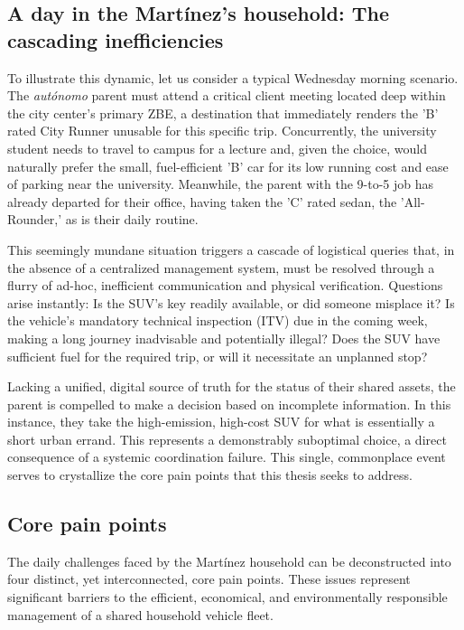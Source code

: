 \subsection{A day in the Martínez's household: The cascading inefficiencies}

To illustrate this dynamic, let us consider a typical Wednesday morning scenario. The \textit{autónomo} parent must attend a critical client meeting located deep within the city center's primary ZBE, a destination that immediately renders the 'B' rated City Runner unusable for this specific trip. Concurrently, the university student needs to travel to campus for a lecture and, given the choice, would naturally prefer the small, fuel-efficient 'B' car for its low running cost and ease of parking near the university. Meanwhile, the parent with the 9-to-5 job has already departed for their office, having taken the 'C' rated sedan, the 'All-Rounder,' as is their daily routine.

\textgap

This seemingly mundane situation triggers a cascade of logistical queries that, in the absence of a centralized management system, must be resolved through a flurry of ad-hoc, inefficient communication and physical verification. Questions arise instantly: Is the SUV's key readily available, or did someone misplace it? Is the vehicle's mandatory technical inspection (ITV) due in the coming week, making a long journey inadvisable and potentially illegal? Does the SUV have sufficient fuel for the required trip, or will it necessitate an unplanned stop?

\textgap

Lacking a unified, digital source of truth for the status of their shared assets, the parent is compelled to make a decision based on incomplete information. In this instance, they take the high-emission, high-cost SUV for what is essentially a short urban errand. This represents a demonstrably suboptimal choice, a direct consequence of a systemic coordination failure. This single, commonplace event serves to crystallize the core pain points that this thesis seeks to address.

\subsection{Core pain points}

The daily challenges faced by the Martínez household can be deconstructed into four distinct, yet interconnected, core pain points. These issues represent significant barriers to the efficient, economical, and environmentally responsible management of a shared household vehicle fleet.

